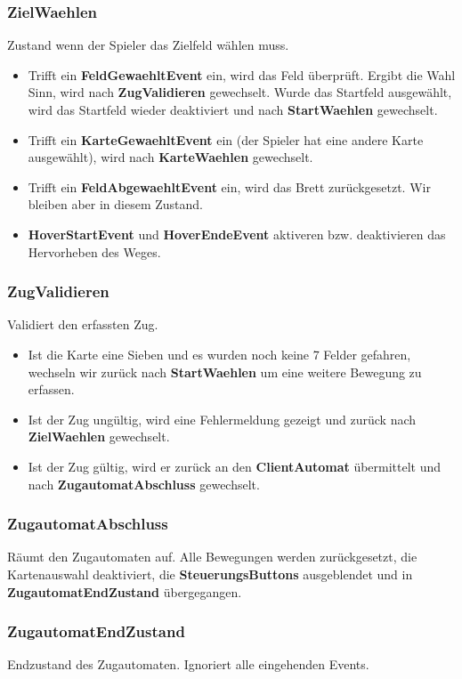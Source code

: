 \documentclass[12pt,halfparskip]{scrartcl}
\begin{document}
\subsubsection{ZielWaehlen}
\label{ssub:zielwaehlen}
Zustand wenn der Spieler das Zielfeld wählen muss.
\begin{itemize}
	\item Trifft ein \textbf{FeldGewaehltEvent} ein, wird das Feld überprüft. Ergibt die Wahl Sinn, wird nach \textbf{ZugValidieren} gewechselt. Wurde das Startfeld ausgewählt, wird das Startfeld wieder deaktiviert und nach \textbf{StartWaehlen} gewechselt.
	\item Trifft ein \textbf{KarteGewaehltEvent} ein (der Spieler hat eine andere Karte ausgewählt), wird nach \textbf{KarteWaehlen} gewechselt.
	\item Trifft ein \textbf{FeldAbgewaehltEvent} ein, wird das Brett zurückgesetzt. Wir bleiben aber in diesem Zustand.
	\item \textbf{HoverStartEvent} und \textbf{HoverEndeEvent} aktiveren bzw. deaktivieren das Hervorheben des Weges.
\end{itemize}

\subsubsection{ZugValidieren}
\label{ssub:zugvalidieren}
Validiert den erfassten Zug.
\begin{itemize}
	\item Ist die Karte eine Sieben und es wurden noch keine 7 Felder gefahren, wechseln wir zurück nach \textbf{StartWaehlen} um eine weitere Bewegung zu erfassen.
	\item Ist der Zug ungültig, wird eine Fehlermeldung gezeigt und zurück nach \textbf{ZielWaehlen} gewechselt.
	\item Ist der Zug gültig, wird er zurück an den \textbf{ClientAutomat} übermittelt und nach \textbf{ZugautomatAbschluss} gewechselt.
\end{itemize}

\subsubsection{ZugautomatAbschluss}
\label{ssub:zugautomatabschluss}
Räumt den Zugautomaten auf. Alle Bewegungen werden zurückgesetzt, die Kartenauswahl deaktiviert, die \textbf{SteuerungsButtons} ausgeblendet und in \textbf{ZugautomatEndZustand} übergegangen.

\subsubsection{ZugautomatEndZustand}
\label{ssub:zugautomatendzustand}
Endzustand des Zugautomaten. Ignoriert alle eingehenden Events.
\end{document}
